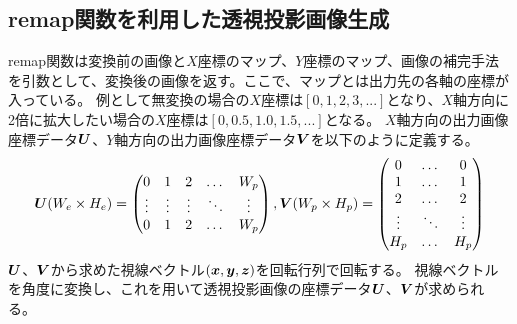 \documentclass[]{jarticle}          %
\begin{document}
\subsection{remap関数を利用した透視投影画像生成}
remap関数は変換前の画像と$X$座標のマップ、$Y$座標のマップ、画像の補完手法を引数として、変換後の画像を返す。ここで、マップとは出力先の各軸の座標が入っている。
例として無変換の場合の$X$座標は$[0,1,2,3,...]$となり、$X$軸方向に2倍に拡大したい場合の$X$座標は$[0,0.5,1.0,1.5,...]$となる。
$X$軸方向の出力画像座標データ$\mbox{\boldmath $U$}$、$Y$軸方向の出力画像座標データ$\mbox{\boldmath $V$}$を以下のように定義する。
\begin{equation}
  \mbox{\boldmath $U$}(W_e \times H_e) = 
  \begin{pmatrix}
    0 & 1 & 2 & \dots & W_p \\
    \vdots & \vdots  & \vdots & \ddots & \vdots \\
    0 & 1 & 2 & \dots & W_p \\
  \end{pmatrix}
  ,
  \mbox{\boldmath $V$}(W_p \times H_p) = 
  \begin{pmatrix}
    0 & \dots & 0 \\
    1 & \dots & 1 \\
    2 & \dots & 2 \\
    \vdots & \ddots & \vdots \\
    H_p & \dots & H_p \\
  \end{pmatrix}
\end{equation}
$\mbox{\boldmath $U$}$、$\mbox{\boldmath $V$}$から求めた視線ベクトル$(\mbox{\boldmath $x$},\mbox{\boldmath $y$},\mbox{\boldmath $z$})$を回転行列で回転する。
視線ベクトルを角度に変換し、これを用いて透視投影画像の座標データ$\mbox{\boldmath $U$}$、$\mbox{\boldmath $V$}$が求められる。
\end{document}

